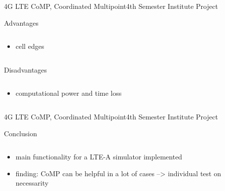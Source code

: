 \documentclass[xcolor={cmyk}]{beamer}
\begin{document}
 \begin{frame}{4G LTE CoMP, Coordinated Multipoint}{4th Semester Institute Project}
	 \begin{block}{Advantages}
	 	\begin{columns}
			\begin{column}{.9\textwidth}
				\begin{itemize}
					\item cell edges
				\end{itemize}
			\end{column}
		\end{columns}
	 \end{block}
	 \begin{block}{Disadvantages}
	 	\begin{columns}
			\begin{column}{.9\textwidth}
				\begin{itemize}
					\item computational power and time loss
				\end{itemize}
			\end{column}
		\end{columns}
	 \end{block}
 \end{frame}

 \begin{frame}{4G LTE CoMP, Coordinated Multipoint}{4th Semester Institute Project}
	 \begin{block}{Conclusion}
	 	\begin{columns}
			\begin{column}{.9\textwidth}
				\begin{itemize}
					\item main functionality for a LTE-A simulator implemented
					\item finding: CoMP can be helpful in a lot of cases --> individual test on necessarity
				\end{itemize}
			\end{column}
		\end{columns}
	 \end{block}
 \end{frame}

\end{document}
